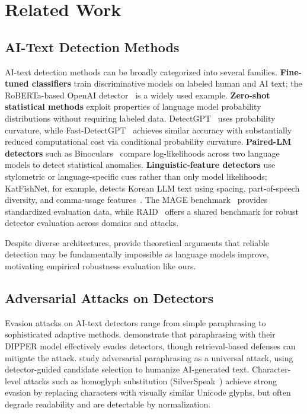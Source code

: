 \documentclass[11pt]{article}
\begin{document}
\section{Related Work}
\label{sec:related}

\subsection{AI-Text Detection Methods}

AI-text detection methods can be broadly categorized into several families. \textbf{Fine-tuned classifiers} train discriminative models on labeled human and AI text; the RoBERTa-based OpenAI detector~\cite{solaiman2019release} is a widely used example. \textbf{Zero-shot statistical methods} exploit properties of language model probability distributions without requiring labeled data. DetectGPT~\cite{mitchell2023detectgptzeroshotmachinegeneratedtext} uses probability curvature, while Fast-DetectGPT~\cite{bao2024fastdetectgptefficientzeroshotdetection} achieves similar accuracy with substantially reduced computational cost via conditional probability curvature. \textbf{Paired-LM detectors} such as Binoculars~\cite{hans2024spottingllmsbinocularszeroshot} compare log-likelihoods across two language models to detect statistical anomalies. \textbf{Linguistic-feature detectors} use stylometric or language-specific cues rather than only model likelihoods; KatFishNet, for example, detects Korean LLM text using spacing, part-of-speech diversity, and comma-usage features~\cite{park-etal-2025-katfishnet}. The MAGE benchmark~\cite{li2024magemachinegeneratedtextdetection} provides standardized evaluation data, while RAID~\cite{dugan2024raidsharedbenchmarkrobust} offers a shared benchmark for robust detector evaluation across domains and attacks.

Despite diverse architectures, \citet{sadasivan2023aigenerated} provide theoretical arguments that reliable detection may be fundamentally impossible as language models improve, motivating empirical robustness evaluation like ours.

\subsection{Adversarial Attacks on Detectors}

Evasion attacks on AI-text detectors range from simple paraphrasing to sophisticated adaptive methods. \citet{krishna2023paraphrasing} demonstrate that paraphrasing with their DIPPER model effectively evades detectors, though retrieval-based defenses can mitigate the attack. \citet{cheng2025adversarialparaphrasinguniversalattack} study adversarial paraphrasing as a universal attack, using detector-guided candidate selection to humanize AI-generated text. Character-level attacks such as homoglyph substitution (SilverSpeak~\cite{creo2025silverspeakevadingaigeneratedtext}) achieve strong evasion by replacing characters with visually similar Unicode glyphs, but often degrade readability and are detectable by normalization.
\end{document}
